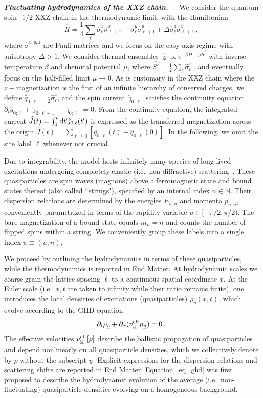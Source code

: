\documentclass[
twocolumn,
amsfonts,
showpacs,
superscriptaddress,
amsmath,
amssymb,
aps,
longbibliography,
prl,
noeprint
]{revtex4-2}
\newcommand{\ch}[1]{{\color{black}  #1}}
\newcommand{\be}{\begin{equation}}
\newcommand{\ee}{\end{equation}}
\newcommand{\uu}{\underline{u}}
\newcommand{\veff}{v^\eff}
\newcommand{\para}[1]{ \noindent\emph{\textbf{#1---}}}
\newcounter{ls}
\newcommand{\dd}{{\rm d}}
\newcommand{\1}{{\bf 1}}
\newcommand{\eff}{{\rm eff}}
\begin{document}
\para{Fluctuating hydrodynamics of the XXZ chain.} We consider the quantum spin$-1/2$ XXZ chain in the thermodynamic limit, with the Hamiltonian
\be\label{eq_Ham}
\hat{H}=\frac{1}{4}\sum_{\ell} \hat{\sigma}^x_\ell\hat{\sigma}^x_{\ell+1}+\hat{\sigma}^y_\ell\hat{\sigma}^y_{\ell+1}+\Delta \hat{\sigma}^z_\ell\hat{\sigma}^z_{\ell+1}\,,
\ee
where $\hat{\sigma}^{x,y,z}$ are Pauli matrices and \ch{we focus on the easy-axis regime with anisotropy $\Delta > 1$.}
We consider \ch{thermal ensembles} $\hat{\varrho}\propto e^{-\beta \hat{H}+\mu \hat{S}^z}$ \ch{with inverse temperature $\beta$ and chemical potential $\mu$,} where $\hat{S^z}=\frac{1}{2}\sum_\ell\hat{\sigma}^z_\ell$\ch{ , and eventually focus on the half-filled limit $\mu\to 0$}. As is customary in the XXZ chain where the $z-$magnetization is the first of an infinite hierarchy of conserved charges, we define $\hat{q}_{0;\ell}=\frac{1}{2}\hat{\sigma}_\ell^z$, and the spin current $\hat{\jmath}_{0;\ell}$ satisfies the continuity equation $\partial_t\hat{q}_{0;\ell}+\hat{\jmath}_{0;\ell+1}-\hat{\jmath}_{0;\ell}=0$. From the continuity equation, the integrated current $\hat{J}(t)=\int_0^t\dd t'\hat{\jmath}_{0;\ell}(t')$ is expressed as the transferred magnetization across the origin $\hat{J}(t)=\sum_{\ell\ge 0}[\hat{q}_{0;\ell}(t)-\hat{q}_{0;\ell}(0)]$.
In the following, we omit the site label $\ell$ whenever not crucial.

Due to integrability, the model hosts infinitely-many species of long-lived excitations undergoing completely elastic (i.e.~non-diffractive) scattering~\cite{Doyon_GHD_lecture}. These quasiparticles are spin waves (magnons) above a ferromagnetic state and bound states thereof (also called ``strings"), specified by an internal index $n\in\mathbb{N}$. Their dispersion relations are determined by the energies $E_{u,n}$ and momenta $p_{u,n}$, conveniently parametrized in terms of the rapidity variable $u\in[-\pi/2,\pi/2)$. The bare magnetization of a bound state equals $m_n=n$ and counts the number of flipped spins within a string.
\ch{We conveniently group these labels into a single index $\uu\equiv(u,n)$.}

We proceed by outlining the hydrodynamics in terms of these quasiparticles, while the thermodynamics is reported in End Matter. At hydrodynamic scales we coarse grain the lattice spacing $\ell$ to a continuous spatial coordinate $x$.
At the Euler scale (i.e.~$x,t$ are taken to infinity while their ratio remains finite), one introduces the local densities of excitations (quasiparticles) $\rho_{\uu}(x,t)$, which evolve according to the GHD equation~\cite{GHD1,GHD2}
\be\label{eq_ghd}
\partial_t \rho_{\uu}+\partial_x(\veff_{\uu}\rho_{\uu})=0\, .
\ee
The effective velocities $\veff_{\uu}[\rho]$ describe the ballistic propagation of quasiparticles and depend nonlinearly on all quasiparticle densities, which we collectively denote by $\rho$ without the subscript $\uu$.
Explicit expressions for the dispersion relations and scattering shifts are reported in End Matter.
Equation~\eqref{eq_ghd} was first proposed to describe the hydrodynamic evolution of the average (i.e.~non-fluctuating) quasiparticle densities evolving on a homogeneous background.
\end{document}
